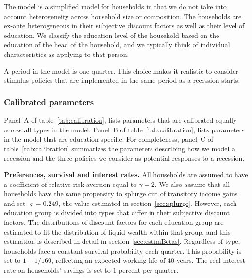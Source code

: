\documentclass[\econtexRoot/HAFiscal]{subfiles}
\begin{document}
The model is a simplified model for households in that we do not take into account heterogeneity across household size or composition. The households are ex-ante heterogeneous in their subjective discount factors as well as their level of education. We classify the education level of the household based on the education of the head of the household, and we typically think of individual characteristics as applying to that person. 

A period in the model is one quarter. This choice makes it realistic to consider stimulus policies that are implemented in the same period as a recession starts. 

\subsubsection{Calibrated parameters} 
\notinsubfile{\label{sec:calib}}

Panel~A of table~\ref{tab:calibration}, lists parameters that are calibrated equally across all types in the model. Panel~B of table~\ref{tab:calibration}, lists parameters in the model that are education specific. For completeness, panel~C of table~\ref{tab:calibration} summarizes the parameters describing how we model a recession and the three policies we consider as potential responses to a recession. 

\textbf{Preferences, survival and interest rates.} All households are assumed to have a coefficient of relative risk aversion equal to $\gamma=2$. We also assume that all households have the same propensity to splurge out of transitory income gains and set $\varsigma=0.249$, the value estimated in section~\ref{sec:splurge}. However, each education group is divided into types that differ in their subjective discount factors. The distributions of discount factors for each education group are estimated to fit the distribution of liquid wealth within that group, and this estimation is described in detail in section~\ref{sec:estimBetas}. Regardless of type, households face a constant survival probability each quarter. This probability is set to $1-1/160$, reflecting an expected working life of 40 years. The real interest rate on households' savings is set to $1$ percent per quarter. 
\end{document}
